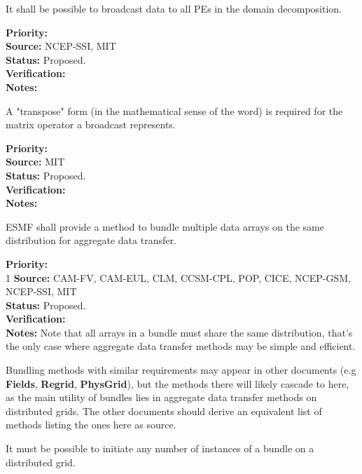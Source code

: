 
It shall be possible to broadcast data to all PEs in the domain decomposition.

\begin{reqlist}
{\bf Priority:} \\ 
{\bf Source:} NCEP-SSI, MIT \\
{\bf Status:} Proposed. \\
{\bf Verification:} \\
{\bf Notes:} 
\end{reqlist}

A "transpose" form (in the mathematical sense of the word) is required
for the matrix operator a broadcast represents.
\begin{reqlist}
{\bf Priority:} \\ 
{\bf Source:}  MIT \\
{\bf Status:} Proposed. \\
{\bf Verification:} \\
{\bf Notes:}
\end{reqlist}


ESMF shall provide a method to bundle multiple data arrays on the same
distribution for aggregate data transfer.

\begin{reqlist}
{\bf Priority:} \\ 1
{\bf Source:} CAM-FV, CAM-EUL, CLM, CCSM-CPL, POP, CICE, NCEP-GSM, NCEP-SSI, MIT \\
{\bf Status:} Proposed. \\
{\bf Verification:} \\
{\bf Notes:} Note that all arrays in a bundle must share the same
  distribution, that's the only case where aggregate data transfer
  methods may be simple and efficient.
  
  Bundling methods with similar requirements may appear in other
  documents (e.g \textbf{Fields}, \textbf{Regrid}, \textbf{PhysGrid}),
  but the methods there will likely cascade to here, as the main
  utility of bundles lies in aggregate data transfer methods on
  distributed grids. The other documents should derive an equivalent
  list of methods listing the ones here as source.
\end{reqlist}


It must be possible to initiate any number of instances of a bundle on
a distributed grid.

